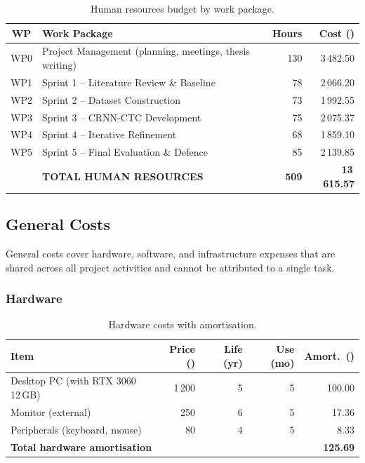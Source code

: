 \documentclass[11pt, a4paper]{article}
\begin{document}
\begin{table}[h!]
    \centering
    \caption{Human resources budget by work package.}
    \label{tab:hr-budget}
    \renewcommand{\arraystretch}{1.05}
    \begin{tabularx}{\linewidth}{c >{\raggedright\arraybackslash}X r r}
        \toprule
        \textbf{WP} & \textbf{Work Package} & \textbf{Hours} & \textbf{Cost (\EUR{})} \\
        \midrule
        WP0 & Project Management (planning, meetings, thesis writing) & 130 & 3\,482.50 \\
        WP1 & Sprint 1 -- Literature Review \& Baseline               &  78 & 2\,066.20 \\
        WP2 & Sprint 2 -- Dataset Construction                        &  73 & 1\,992.55 \\
        WP3 & Sprint 3 -- CRNN-CTC Development                        &  75 & 2\,075.37 \\
        WP4 & Sprint 4 -- Iterative Refinement                        &  68 & 1\,859.10 \\
        WP5 & Sprint 5 -- Final Evaluation \& Defence                 &  85 & 2\,139.85 \\
        \midrule
        & \textbf{TOTAL HUMAN RESOURCES} & \textbf{509} & \textbf{13\,615.57} \\
        \bottomrule
    \end{tabularx}
\end{table}

\subsection{General Costs}
\label{sec:general-costs}

General costs cover hardware, software, and infrastructure expenses that are shared across all project activities and cannot be attributed to a single task.

\subsubsection{Hardware}

\begin{table}[h!]
    \centering
    \caption{Hardware costs with amortisation.}
    \label{tab:hw}
    \renewcommand{\arraystretch}{1.1}
    \begin{tabularx}{\linewidth}{X r r r r}
        \toprule
        \textbf{Item} & \textbf{Price (\EUR{})} & \textbf{Life (yr)} & \textbf{Use (mo)} & \textbf{Amort.\ (\EUR{})} \\
        \midrule
        Desktop PC (with RTX 3060 12\,GB) & 1\,200 & 5 & 5 & 100.00 \\
        Monitor (external)          & 250    & 6 & 5 & 17.36 \\
        Peripherals (keyboard, mouse) & 80   & 4 & 5 & 8.33 \\
        \midrule
        \multicolumn{4}{l}{\textbf{Total hardware amortisation}} & \textbf{125.69} \\
        \bottomrule
    \end{tabularx}
\end{table}
\end{document}
